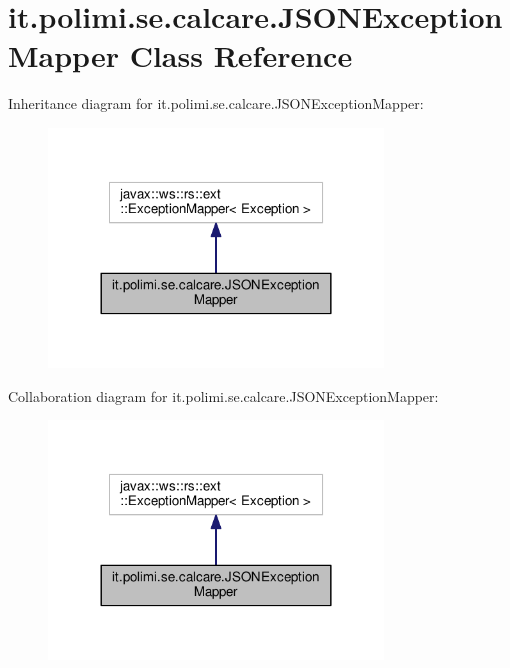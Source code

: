 \hypertarget{classit_1_1polimi_1_1se_1_1calcare_1_1JSONExceptionMapper}{}\section{it.\+polimi.\+se.\+calcare.\+J\+S\+O\+N\+Exception\+Mapper Class Reference}
\label{classit_1_1polimi_1_1se_1_1calcare_1_1JSONExceptionMapper}


Inheritance diagram for it.\+polimi.\+se.\+calcare.\+J\+S\+O\+N\+Exception\+Mapper\+:
\nopagebreak
\begin{figure}[H]
\begin{center}
\leavevmode
\includegraphics[width=252pt]{classit_1_1polimi_1_1se_1_1calcare_1_1JSONExceptionMapper__inherit__graph}
\end{center}
\end{figure}


Collaboration diagram for it.\+polimi.\+se.\+calcare.\+J\+S\+O\+N\+Exception\+Mapper\+:
\nopagebreak
\begin{figure}[H]
\begin{center}
\leavevmode
\includegraphics[width=252pt]{classit_1_1polimi_1_1se_1_1calcare_1_1JSONExceptionMapper__coll__graph}
\end{center}
\end{figure}
